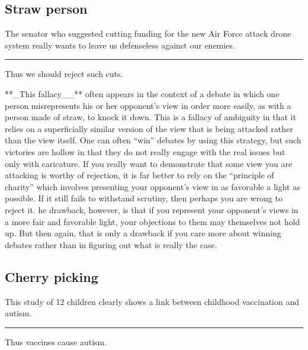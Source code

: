 \documentclass[]{book}
\makeatletter
\newenvironment{kframe}{%
\medskip{}
\setlength{\fboxsep}{.8em}
 \def\at@end@of@kframe{}%
 \ifinner\ifhmode%
  \def\at@end@of@kframe{\end{minipage}}%
  \begin{minipage}{\columnwidth}%
 \fi\fi%
 \def\FrameCommand##1{\hskip\@totalleftmargin \hskip-\fboxsep
 \colorbox{shadecolor}{##1}\hskip-\fboxsep
     \hskip-\linewidth \hskip-\@totalleftmargin \hskip\columnwidth}%
 \MakeFramed {\advance\hsize-\width
   \@totalleftmargin\z@ \linewidth\hsize
   \@setminipage}}%
 {\par\unskip\endMakeFramed%
 \at@end@of@kframe}
\newenvironment{rmdblock}[1]
  {
  \begin{itemize}
  \renewcommand{\labelitemi}{
    \raisebox{-.7\height}[0pt][0pt]{
      {\setkeys{Gin}{width=3em,keepaspectratio}\texttt{[image: img/\#1]}}
    }
  }
  \setlength{\fboxsep}{1em}
  \begin{kframe}
  \item
  }
  {
  \end{kframe}
  \end{itemize}
  }
\newenvironment{rmdwarning}
  {\begin{rmdblock}{warning}}
  {\end{rmdblock}}
\makeatother
\begin{document}
\hypertarget{straw-person}{%
\subsection*{Straw person}\label{straw-person}}


\begin{rmdwarning}
The senator who suggested cutting funding for the new Air Force attack
drone system really wants to leave us defenseless against our enemies.

\begin{center}\rule{0.5\linewidth}{\linethickness}\end{center}

Thus we should reject such cuts.
\end{rmdwarning}

**\_This fallacy\_\_** often appears in the context of a debate in which one person misrepresents his or her opponent's view in order more easily, as with a person made of straw, to knock it down. This is a fallacy of ambiguity in that it relies on a superficially similar version of the view that is being attacked rather than the view itself. One can often ``win'' debates by using this strategy, but such victories are hollow in that they do not really engage with the real issues but only with caricature. If you really want to demonstrate that some view you are attacking is worthy of rejection, it is far better to rely on the ``principle of charity'' which involves presenting your opponent's view in as favorable a light as possible. If it still fails to withstand scrutiny, then perhaps you are wrong to reject it. he drawback, however, is that if you represent your opponent's views in a more fair and favorable light, your objections to them may themselves not hold up. But then again, that is only a drawback if you care more about winning debates rather than in figuring out what is really the case.

\hypertarget{cherry-picking}{%
\subsection*{Cherry picking}\label{cherry-picking}}


\begin{rmdwarning}
This study of 12 children clearly shows a link between childhood
vaccination and autism.

\begin{center}\rule{0.5\linewidth}{\linethickness}\end{center}

Thus vaccines cause autism.
\end{rmdwarning}
\end{document}
